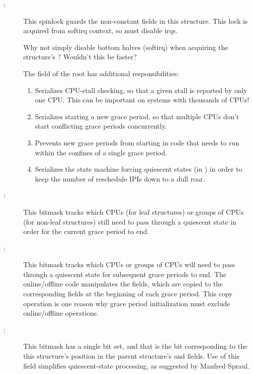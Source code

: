 \begin{description}
\item[:]
	This spinlock guards the non-constant fields in this structure.
	This lock is acquired from softirq context, so must disable
	irqs.

\QuickQuiz{}
	Why not simply disable bottom halves (softirq) when acquiring
	the  structure's ?
	Wouldn't this be faster?
 \QuickQuizEnd

	The  field of the root  has additional
	responsibilities:
	\begin{enumerate}
	\item	Serializes CPU-stall checking, so that a given stall
		is reported by only one CPU.
		This can be important on systems with thousands of
		CPUs!
	\item	Serializes starting a new grace period, so that
		multiple CPUs don't start conflicting grace periods
		concurrently.
	\item	Prevents new grace periods from starting in code that
		needs to run within the confines of a single grace period.
	\item	Serializes the state machine forcing quiescent states
		(in ) in order to
		keep the number of reschedule IPIs down to a dull
		roar.
	\end{enumerate}
\item[:]
	This bitmask tracks which CPUs (for leaf  structures)
	or groups of CPUs (for non-leaf  structures)
	still need to pass through a quiescent state in order for the
	current grace period to end.
\item[:]
	This bitmask tracks which CPUs or groups of CPUs will need to
	pass through a quiescent state for subsequent grace periods
	to end.
	The online/offline code manipulates the  fields,
	which are copied to the corresponding  fields at
	the beginning of each grace period.
	This copy operation is one reason why grace period initialization
	must exclude online/offline operations.
\item[:]
	This bitmask has a single bit set, and that is the bit corresponding
	to the this  structure's position in the parent
	 structure's  and 
	fields.
	Use of this field simplifies quiescent-state processing,
	as suggested by Manfred Spraul.


\end{description}
